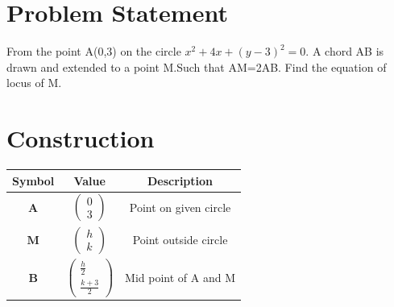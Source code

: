 \documentclass[10pt,a4paper]{report}
\newcommand{\myvec}[1]{\ensuremath{\begin{pmatrix}#1\end{pmatrix}}}
\let\vec\mathbf
\begin{document}
\begin{multicols}{2}
\section*{Problem Statement}
From the point A(0,3) on the circle $x^2+4x+(y-3)^2=0$. A chord AB is drawn and extended to a point M.Such that AM=2AB. Find the equation of locus of M.
\section*{Construction}
\hspace{0.25cm}
\begin{tabular}{|c|c|c|}
	\hline
	\textbf{Symbol}&\textbf{Value}&\textbf{Description}\\
	\hline
    $\vec{A}$&$\myvec{0 \\ 3}$&Point on given circle\\
	\hline
	$\vec{M}$&$\myvec{h \\ k}$ & Point outside circle\\
	 \hline
	 $\vec{B}$ & $\myvec{\frac{h}{2} \\ \frac{k+3}{2}}$& Mid point of A and M\\


\end{tabular}
\end{multicols}
\end{document}
